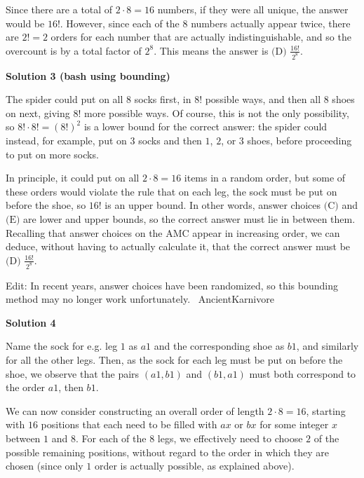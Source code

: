 \begin{enumerate}
 Since there are a total of $2 \cdot 8 = 16$ numbers, if they were all unique, the answer would be $16!$. However, since each of the $8$ numbers actually appear twice, there are $2! = 2$ orders for each number that are actually indistinguishable, and so the overcount is by a total factor of $2^8$. This means the answer is $\boxed{\text{(D) }\frac {16!}{2^8}}$.

 



\textbf{Solution 3 (bash using bounding)}

The spider could put on all $8$ socks first, in $8!$ possible ways, and then all $8$ shoes on next, giving $8!$ more possible ways. Of course, this is not the only possibility, so $8! \cdot 8! = (8!)^2$ is a lower bound for the correct answer: the spider could instead, for example, put on $3$ socks and then $1$, $2$, or $3$ shoes, before proceeding to put on more socks.

 In principle, it could put on all $2 \cdot 8 = 16$ items in a random order, but some of these orders would violate the rule that on each leg, the sock must be put on before the shoe, so $16!$ is an upper bound. In other words, answer choices $\text{(C)}$ and $\text{(E)}$ are lower and upper bounds, so the correct answer must lie in between them. Recalling that answer choices on the AMC appear in increasing order, we can deduce, without having to actually calculate it, that the correct answer must be $\boxed{\text{(D) }\frac {16!}{2^8}}$.

 Edit: In recent years, answer choices have been randomized, so this bounding method may no longer work unfortunately. ~AncientKarnivore

 



\textbf{Solution 4}

Name the sock for e.g. leg $1$ as $a1$ and the corresponding shoe as $b1$, and similarly for all the other legs. Then, as the sock for each leg must be put on before the shoe, we observe that the pairs $(a1,b1)$ and $(b1,a1)$ must both correspond to the order $a1$, then $b1$.

 We can now consider constructing an overall order of length $2 \cdot 8 = 16$, starting with $16$ positions that each need to be filled with $ax$ or $bx$ for some integer $x$ between $1$ and $8$. For each of the $8$ legs, we effectively need to choose $2$ of the possible remaining positions, without regard to the order in which they are chosen (since only $1$ order is actually possible, as explained above).


\end{enumerate}
